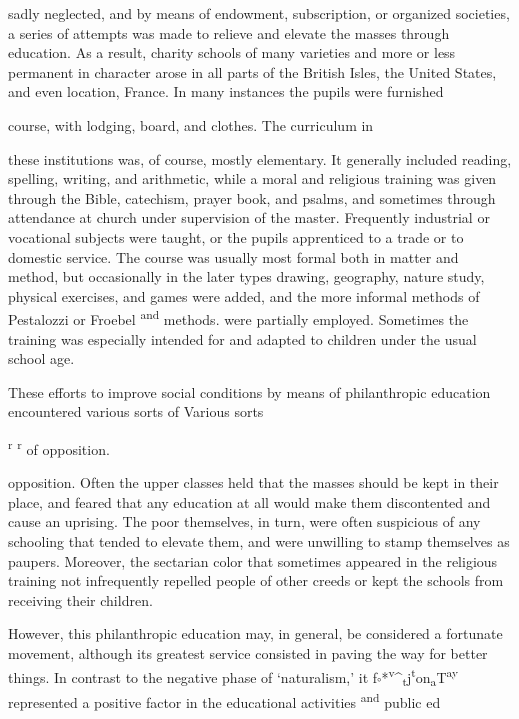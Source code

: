 \documentclass[]{book}
\begin{document}
sadly neglected, and by means of endowment, subscription, or organized societies, a series of attempts was made to relieve and elevate the masses through education. As a result, charity schools of many varieties and more or less permanent in character arose in all parts of the British Isles, the United States, and even location, France. In many instances the pupils were furnished

course, with lodging, board, and clothes. The curriculum in

these institutions was, of course, mostly elementary. It generally included reading, spelling, writing, and arithmetic, while a moral and religious training was given\protect\hypertarget{ch20.xmlux5cux23para.310.1.0.box.141.245.1242.637.q.60}{}{ through the Bible, catechism, prayer book, and psalms, and sometimes through attendance at church under supervision of the master. Frequently industrial or vocational subjects were taught, or the pupils apprenticed to a trade or to domestic service. The course was usually most formal both in matter and method, but occasionally in the later types drawing, geography, nature study, physical exercises, and games were added, and the more informal methods of Pestalozzi or Froebel \textsuperscript{and} methods. were partially employed. Sometimes the training was especially intended for and adapted to children under the usual school age.}

These efforts to improve social conditions by means of philanthropic education encountered various sorts of Various sorts

\textsuperscript{r} \textsuperscript{r} of opposition.

opposition. Often the upper classes held that the masses should be kept in their place, and feared that any education at all would make them discontented and cause an uprising. The poor themselves, in turn, were often suspicious of any schooling that tended to elevate them, and were unwilling to stamp themselves as paupers. Moreover, the sectarian color that sometimes appeared in the religious training not infrequently repelled people of other creeds or kept the schools from receiving their children.

However, this philanthropic education may, in general, be considered a fortunate movement, although its greatest service consisted in paving the way for better things. In contrast to the negative phase of `naturalism,' it f\textsubscript{°}*\textsuperscript{v}\^{}\textsubscript{t}j\textsuperscript{t}on\textsubscript{a}T\textsuperscript{ay} represented a positive factor in the educational activities \textsuperscript{and} public ed
\end{document}
